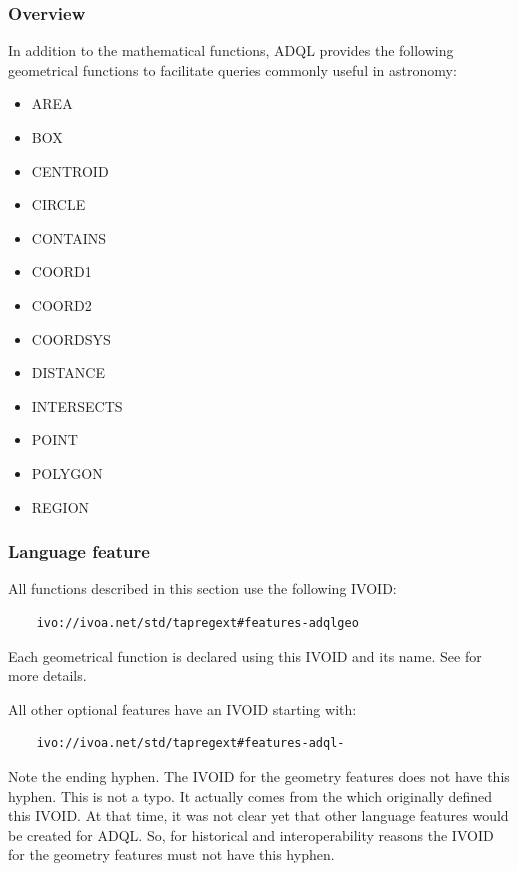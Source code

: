 \documentclass[11pt,a4paper]{ivoa}
\begin{document}
\subsubsection{Overview}
\label{sec:functions.geom.overview}

In addition to the mathematical functions, ADQL provides the following geometrical
functions to facilitate queries commonly useful in astronomy:

\begin{itemize}
    \item AREA
    \item BOX
    \item CENTROID
    \item CIRCLE
    \item CONTAINS
    \item COORD1
    \item COORD2
    \item COORDSYS
    \item DISTANCE
    \item INTERSECTS
    \item POINT
    \item POLYGON
    \item REGION
\end{itemize}

\subsubsection{Language feature}
\label{sec:functions.geom.feature}

All functions described in this section use the following IVOID:

\begin{verbatim}
    ivo://ivoa.net/std/tapregext#features-adqlgeo
\end{verbatim}

Each geometrical function is declared using this IVOID and its name.
See  for more details.

All other optional features have an IVOID starting with:

\begin{verbatim}
    ivo://ivoa.net/std/tapregext#features-adql-
\end{verbatim}

Note the ending hyphen. The IVOID for the geometry features does not have this
hyphen. This is not a typo. It actually comes from the \TAPRegSpec{} which
originally defined this IVOID. At that time, it was not clear yet that other
language features would be created for ADQL. So, for historical and
interoperability reasons the IVOID for the geometry features must not have this
hyphen.
\end{document}
